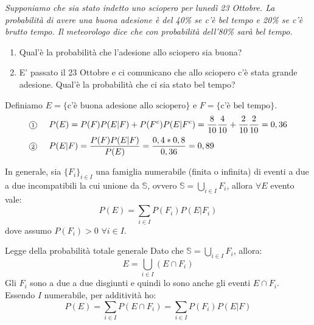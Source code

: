 \begin{Example}{}{}
    \textit{Supponiamo che sia stato indetto uno sciopero per lunedì 23 Ottobre. La probabilità di avere una buona adesione è del 40\% se c'è bel tempo e 20\% se c'è brutto tempo. Il meteorologo dice che con probabilità dell'80\% sarà bel tempo.}
    \begin{enumerate}
        \item Qual'è la probabilità che l'adesione allo sciopero sia buona?
        \item E' passato il 23 Ottobre e ci comunicano che allo sciopero c'è stata grande adesione. Qual'è la probabilità che ci sia stato bel tempo?
    \end{enumerate}
    
    Definiamo $E=\{\mbox{c'è buona adesione allo sciopero}\}$ e $F=\{\mbox{c'è bel tempo}\}$.
    \begin{align*}
        &\circled{1}\hspace{.5cm}P(E)=P(F)P(E|F)+P(F^c)P(E|F^c)=\frac{8}{10}\frac{4}{10}+\frac{2}{10}\frac{2}{10}=0,36\\
        &\circled{2}\hspace{.5cm}P(E|F)=\frac{P(F)P(E|F)}{P(E)}=\frac{0,4*0,8}{0,36}=0,89
    \end{align*}
\end{Example}

In generale, sia $\{F_i\}_{i\in I}$ una famiglia numerabile (finita o infinita) di eventi a due a due incompatibili la cui unione da $\mathbb{S}$, ovvero $\mathbb{S}=\bigcup_{i\in I}F_i$, allora $\forall E$ evento vale:
\begin{equation*}
    P(E)=\sum_{i\in I}P(F_i)P(E|F_i)
\end{equation*}
dove assumo $P(F_i)>0$ $\forall i\in I$.

\begin{Demonstration}{Legge della probabilità totale generale}{}
    Dato che $\mathbb{S}=\bigcup_{i\in I}F_i$, allora:
    \begin{equation*}
        E=\bigcup_{i\in I}(E\cap F_i)
    \end{equation*}
    Gli $F_i$ sono a due a due disgiunti e quindi lo sono anche gli eventi $E\cap F_i$. Essendo $I$ numerabile, per additività ho:
    \begin{equation*}
        P(E)=\sum_{i\in I}P(E\cap F_i)=\sum_{i\in I}P(F_i)P(E|F)
    \end{equation*}
\end{Demonstration}

